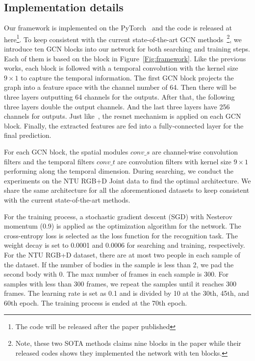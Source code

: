 \documentclass[letterpaper]{article} \usepackage{aaai19}  \usepackage{times}  \usepackage{helvet} \usepackage{courier}  \usepackage[hyphens]{url}  \usepackage{graphicx} \urlstyle{rm} \def\UrlFont{\rm}  \usepackage{graphicx}  \frenchspacing  \setlength{\pdfpagewidth}{8.5in}  \setlength{\pdfpageheight}{11in}
\begin{document}
\subsection{Implementation details} 
Our framework is implemented on the PyTorch~\cite{paszke2017automatic} and the code is released at here\footnote{The code will be released after the paper published}. To keep consistent with the current state-of-the-art GCN methods~\cite{yan2018stgan,shi2019two}\footnote{Note, these two SOTA methods claims nine blocks in the paper while their released codes shows they implemented the network with ten blocks.}, we introduce ten GCN blocks into our network for both searching and training steps. Each of them is based on the block in Figure~\ref{Fig:framework}. Like the previous works, each block is followed with a temporal convolution with the kernel size $9\times 1$ to capture the temporal information. The first GCN block projects the graph into a feature space with the channel number of 64. Then there will be three layers outputting 64 channels for the outputs. After that, the following three layers double the output channels. And the last three layers have 256 channels for outputs. Just like~\cite{yan2018stgan}, the resnet mechanism is applied on each GCN block. Finally, the extracted features are fed into a fully-connected layer for the final prediction.  

For each GCN block, the spatial modules $conv\_s$ are channel-wise convolution filters and the temporal filters $conv\_t$ are convolution filters with kernel size $9\times 1$ performing along the temporal dimension. During searching, we conduct the experiments on the NTU RGB+D Joint data to find the optimal architecture. We share the same architecture for all the aforementioned datasets to keep consistent with the current state-of-the-art methods. 


For the training process, a stochastic gradient descent (SGD) with Nesterov momentum (0.9) is applied as the optimization algorithm for the network. The cross-entropy loss is selected as the loss function for the recognition task. The weight decay is set to 0.0001 and 0.0006 for searching and training, respectively. For the NTU RGB+D dataset, there are at most two people in each sample of the dataset. If the number of bodies in the sample is less than 2, we pad the second body with 0. The max number of frames in each sample is 300. For samples with less than 300 frames, we repeat the samples until it reaches 300 frames. The learning rate is set as 0.1 and is divided by 10 at the 30th, 45th, and 60th epoch. The training process is ended at the 70th epoch.
\end{document}
